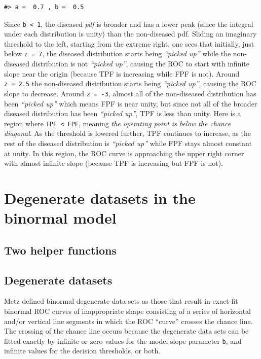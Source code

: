 \documentclass[]{book}
\begin{document}
\begin{verbatim}
#> a =  0.7 , b =  0.5
\end{verbatim}

Since \texttt{b\ \textless{}\ 1}, the diseased \emph{pdf} is broader and has a lower peak (since the integral under each distribution is unity) than the non-diseased pdf. Sliding an imaginary threshold to the left, starting from the extreme right, one sees that initially, just below \texttt{z\ =\ 7}, the diseased distribution starts being \emph{``picked up''} while the non-diseased distribution is not \emph{``picked up''}, causing the ROC to start with infinite slope near the origin (because TPF is increasing while FPF is not). Around \texttt{z\ =\ 2.5} the non-diseased distribution starts being \emph{``picked up''}, causing the ROC slope to decrease. Around \texttt{z\ =\ -3}, almost all of the non-diseased distribution has been \emph{``picked up''} which means FPF is near unity, but since not all of the broader diseased distribution has been \emph{``picked up''}, TPF is less than unity. Here is a region where \texttt{TPF\ \textless{}\ FPF}, meaning \emph{the operating point is below the chance diagonal}. As the threshold is lowered further, TPF continues to increase, as the rest of the diseased distribution is \emph{``picked up''} while FPF stays almost constant at unity. In this region, the ROC curve is approaching the upper right corner with almost infinite slope (because TPF is increasing but FPF is not).

\hypertarget{DegenerateDatasetsBinormalModel}{%
\chapter{Degenerate datasets in the binormal model}\label{DegenerateDatasetsBinormalModel}}

\hypertarget{two-helper-functions}{%
\section{Two helper functions}\label{two-helper-functions}}

\hypertarget{degenerate-datasets}{%
\section{Degenerate datasets}\label{degenerate-datasets}}

Metz defined binormal degenerate data sets as those that result in exact-fit binormal ROC curves of inappropriate shape consisting of a series of horizontal and/or vertical line segments in which the ROC ``curve'' crosses the chance line. The crossing of the chance line occurs because the degenerate data sets can be fitted exactly by infinite or zero values for the model slope parameter \texttt{b}, and infinite values for the decision thresholds, or both.
\end{document}
